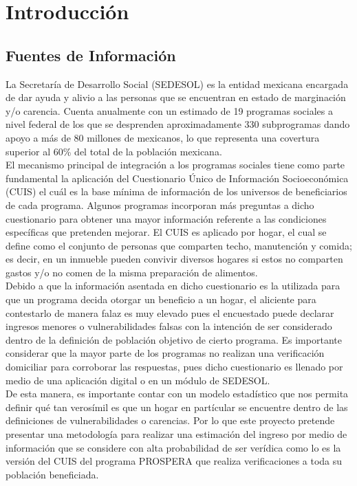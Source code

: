 \chapter{Introducción}
\section{Fuentes de Información}
La Secretaría de Desarrollo Social (SEDESOL) es la entidad mexicana encargada de dar ayuda y alivio a las personas que se encuentran en estado de marginación y/o carencia. Cuenta anualmente con un estimado de 19 programas sociales a nivel federal de los que se desprenden aproximadamente 330 subprogramas dando apoyo a más de 80 millones de mexicanos, lo que representa una covertura superior al 60\% del total de la población mexicana.\\
El mecanismo principal de integración a los programas sociales tiene como parte fundamental la aplicación del Cuestionario Único de Información Socioeconómica (CUIS) el cuál es la base mínima de información de los universos de beneficiarios de cada programa. Algunos programas incorporan más preguntas a dicho cuestionario para obtener una mayor información referente a las condiciones específicas que pretenden mejorar. El CUIS es aplicado por hogar, el cual se define como el conjunto de personas que comparten techo, manutención y comida; es decir, en un inmueble pueden convivir diversos hogares si estos no comparten gastos y/o no comen de la misma preparación de alimentos.\\
Debido a que la información asentada en dicho cuestionario es la utilizada para que un programa decida otorgar un beneficio a un hogar, el aliciente para contestarlo de manera falaz es muy elevado pues el encuestado puede declarar ingresos menores o vulnerabilidades falsas con la intención de ser considerado dentro de la definición de población objetivo de cierto programa. Es importante considerar que la mayor parte de los programas no realizan una verificación domiciliar para corroborar las respuestas, pues dicho cuestionario es llenado por medio de una aplicación digital o en un módulo de SEDESOL.\\
De esta manera, es importante contar con un modelo estadístico que nos permita definir qué tan verosímil es que un hogar en partícular se encuentre dentro de las definiciones de vulnerabilidades o carencias. Por lo que este proyecto pretende presentar una metodología para realizar una estimación del ingreso por medio de información que se considere con alta probabilidad de ser verídica como lo es la versión del CUIS del programa PROSPERA que realiza verificaciones a toda su población beneficiada.\\
